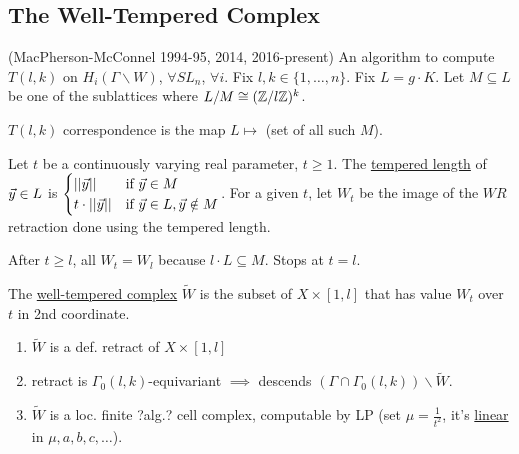 \documentclass[]{article}
\begin{document}
\subsection*{The Well-Tempered Complex}

(MacPherson-McConnel 1994-95, 2014, 2016-present) An algorithm to compute $T(l,k)$ on $H_i(\Gamma\backslash W)$, $\forall SL_n$, $\forall i$. Fix $l,k\in\{1,\dots,n\}$. Fix $L = g\cdot K$. Let $M\subseteq L$ be one of the sublattices where $L/M \cong (\mathbb{Z}/l\mathbb{Z})^k$.
\begin{recall}
	$T(l,k)$ correspondence is the map $L\mapsto $ (set of all such $M$).
\end{recall}
\begin{definition}
	Let $t$ be a continuously varying real parameter, $t\geq 1$. The \ul{tempered length} of $\vec{y}\in L$ is $\begin{cases} ||\vec{y}|| & \text{if } \vec{y}\in M \\ t\cdot ||\vec{y}|| & \text{if } \vec{y}\in L, \vec{y}\notin M \end{cases}$. For a given $t$, let $W_t$ be the image of the $WR$ retraction done using the tempered length.
\end{definition}
\begin{remark}
	After $t\geq l$, all $W_t = W_l$ because $l\cdot L\subseteq M$. Stops at $t = l$.
\end{remark}
\begin{definition}
	The \ul{well-tempered complex} $\tilde{W}$ is the subset of $X\times [1,l]$ that  has value $W_t$ over $t$ in 2nd coordinate.
\end{definition}
\begin{theorem}
	[M-M 2016] \begin{enumerate}
		\item $\tilde{W}$ is a def. retract of $X\times [1,l]$
		\item retract is $\Gamma_0(l,k)$-equivariant $\implies$ descends $(\Gamma\cap \Gamma_0(l,k))\backslash \tilde{W}$.
		\item $\tilde{W}$ is a loc. finite ?alg.? cell complex, computable by LP (set $\mu = \frac{1}{t^2}$, it's \ul{linear} in $\mu,a,b,c,\dots$).
	\end{enumerate}
\end{theorem}
\end{document}
